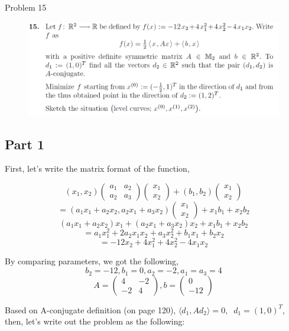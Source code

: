 \documentclass[12pt]{article}
\begin{document}
\begin{section}{Problem 15}
	
	\begin{figure}[htp]
		\centering
		\includegraphics[width=12cm]{problem15.png}
	\end{figure}
	\subsection{Part 1}
	First, let's write the matrix format of the function,

	$$(x_1, x_2) \begin{pmatrix}
	a_1 & a_2\\
	a_2 & a_3 \end{pmatrix}
	\begin{pmatrix}
	x_1\\ 
	x_2
	\end{pmatrix} + (b_1, b_2) \begin{pmatrix}
	x_1\\
	x_2
	\end{pmatrix}$$
	\[= (a_1x_1 + a_2x_2, a_2x_1+a_3x_2) \begin{pmatrix}
	x_1\\
	x_2
	\end{pmatrix} + x_1b_1 + x_2b_2\]
	\[(a_1x_1 + a_2x_2)x_1 + (a_2x_1 + a_3x_2)x_2 + x_1b_1 + x_2b_2\]
	\[=a_1x_1^2 + 2a_2x_1x_2 + a_3x_2^2 + b_1x_1 + b_2x_2\]
	\[=-12x_2 + 4x_1^2 + 4x_2^2-4x_1x_2\]	

	By comparing parameters, we got the following, 
	\[b_2 = -12, b_1 = 0, a_2 = -2, a_1 =a_3 = 4\]
	\[A = \begin{pmatrix}
	4 & -2\\
	-2 & 4 
	\end{pmatrix}, b = \begin{pmatrix}
	0\\
	-12
	\end{pmatrix}\]
	
	Based on A-conjugate definition (on page 120), $\langle d_1, Ad_2 \rangle = 0, \;\; d_1 = (1,0)^T$, then, let's write out the problem as the following: 
	

\end{section}
\end{document}
